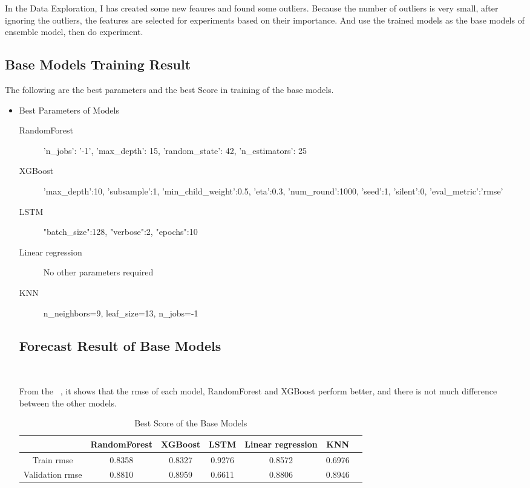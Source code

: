 In the Data Exploration, 
I has created some new feaures 
and found some outliers.
Because the number of outliers is very small, 
after ignoring the outliers, the features 
are selected for experiments based on their importance.
And use the trained models as 
the base models of ensemble model,
then do experiment.

\subsection{Base Models Training Result}

The following are the best parameters and 
the best Score in training of 
the base models. 

\begin{itemize}
	\item Best Parameters of Models
	\begin{description}
		\item[RandomForest] 'n_jobs': '-1', 'max_depth': 15, 
		'random_state': 42, 'n_estimators': 25
		\item[XGBoost] 'max_depth':10, 
		'subsample':1,
		'min_child_weight':0.5,
		'eta':0.3, 
		'num_round':1000, 
		'seed':1,
		'silent':0,
		'eval_metric':'rmse'
		\item[LSTM] "batch_size":128,
		"verbose":2,
		"epochs":10
		\item[Linear regression] No other parameters required
		\item[KNN] n_neighbors=9, leaf_size=13, n_jobs=-1
	\end{description}


\subsection{Forecast Result of Base Models}
\

From the  ~,
it shows that the rmse of 
each model, RandomForest and XGBoost 
perform better, and there is not much 
difference between the other models.

\begin{table}[h]  \centering
	\caption{Best Score of the Base Models}
	\label{tbl:best_score_base_models_old}
	\begin{tabular}{ccccccc}
		\toprule
		& RandomForest & XGBoost & LSTM & Linear regression & KNN\\
		\midrule
		Train rmse & 0.8358 & 0.8327 & 0.9276 & 0.8572 & 0.6976\\
		Validation rmse & 0.8810 & 0.8959 & 0.6611 & 0.8806 & 0.8946\\
		\bottomrule
	\end{tabular}
\end{table}
\end{itemize}


